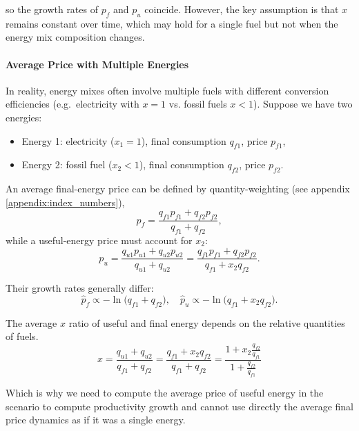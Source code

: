 \documentclass[11pt]{article}
\begin{document}
so the growth rates of $p_f$ and $p_u$ coincide.
However, the key assumption is that $x$ remains constant over time, which may hold for a single fuel but not when the energy mix composition changes.


\paragraph{Average Price with Multiple Energies}

In reality, energy mixes often involve multiple fuels with different conversion efficiencies (e.g.\ electricity with $x=1$ vs. fossil fuels $x<1$). Suppose we have two energies:

\begin{itemize}
    \item Energy 1: electricity ($x_1 = 1$), final consumption $q_{f1}$, price $p_{f1}$,
    \item Energy 2: fossil fuel ($x_2 < 1$), final consumption $q_{f2}$, price $p_{f2}$.
\end{itemize}

\noindent An average final-energy price can be defined by quantity-weighting (see appendix \ref{appendix:index_numbers}),
\begin{equation*}
     p_f = \frac{q_{f1}  p_{f1} + q_{f2}p_{f2}}{q_{f1} + q_{f2}},
\end{equation*}
while a useful-energy price must account for $x_2$:
\begin{equation*}
     p_u 
  = \frac{q_{u1}p_{u1} + q_{u2}p_{u2}}{q_{u1} +  q_{u2}} = \frac{q_{f1}p_{f1} + q_{f2}p_{f2}}{q_{f1} + x_2  q_{f2}}. 
\end{equation*}

Their growth rates generally differ:
\begin{equation*}
  \hat{p}_f \propto 
    - \ln\bigl(q_{f1} + q_{f2}\bigr), 
  \quad
  \hat{p}_u \propto
    - \ln\bigl(q_{f1} + x_2q_{f2}\bigr).
\end{equation*}

The average $x$ ratio of useful and final energy depends on the relative quantities of fuels. 
\begin{equation*}
    x=\frac{q_{u1} +  q_{u2}}{q_{f1} + q_{f2}}
    =\frac{q_{f1} +  x_2q_{f2}}{q_{f1} + q_{f2}}
    =\frac{1 +  x_2\frac{q_{f2}}{q_{f1}}}{1+\frac{q_{f2}}{q_{f1}}}
\end{equation*}

Which is why we need to compute the average price of useful energy in the scenario to compute productivity growth and cannot use directly the average final price dynamics as if it was a single energy.
\end{document}
